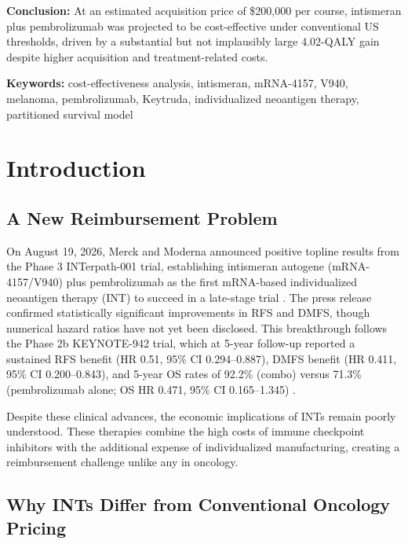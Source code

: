 \documentclass[12pt,a4paper]{article}
\begin{document}
\textbf{Conclusion:} At an estimated acquisition price of \$200,000 per course, intismeran plus \mbox{pembrolizumab} was projected to be cost-effective under conventional US thresholds, driven by a substantial but not implausibly large 4.02-QALY gain despite higher acquisition and treatment-related costs.

\noindent\parbox{0.94\linewidth}{\textbf{Keywords:} cost-effectiveness analysis, intismeran, mRNA-4157, V940, melanoma, \mbox{pembrolizumab}, Keytruda, individualized neoantigen therapy, partitioned survival model}

\endgroup

\newpage

\doublespacing

\section{Introduction}

\subsection{A New Reimbursement Problem}

On August 19, 2026, Merck and Moderna announced positive topline results from the Phase 3 \mbox{INTerpath-001} trial, establishing intismeran autogene (mRNA-4157/V940) plus \mbox{pembrolizumab} as the first mRNA-based individualized neoantigen therapy (INT) to succeed in a late-stage trial \cite{merck2026}. The press release confirmed statistically significant improvements in RFS and DMFS, though numerical hazard ratios have not yet been disclosed. This breakthrough follows the Phase 2b \mbox{KEYNOTE-942} trial, which at 5-year follow-up reported a sustained RFS benefit (HR 0.51, 95\% CI 0.294--0.887), DMFS benefit (HR 0.411, 95\% CI 0.200--0.843), and 5-year OS rates of 92.2\% (combo) versus 71.3\% (\mbox{pembrolizumab} alone; OS HR 0.471, 95\% CI 0.165--1.345) \cite{khattak2026}.

Despite these clinical advances, the economic implications of INTs remain poorly understood. These therapies combine the high costs of immune checkpoint inhibitors with the additional expense of individualized manufacturing, creating a reimbursement challenge unlike any in oncology.

\subsection{Why INTs Differ from Conventional Oncology Pricing}
\end{document}
